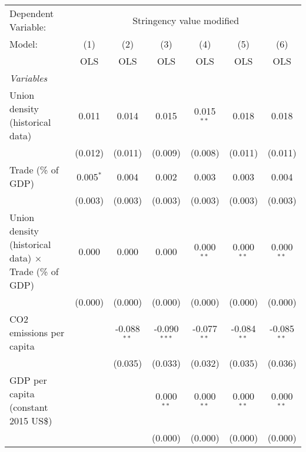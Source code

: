 
\begingroup
\centering
\begin{tabular}{lcccccc}
   \toprule
   Dependent Variable: & \multicolumn{6}{c}{Stringency value modified}\\
   Model:                                                       & (1)         & (2)           & (3)            & (4)           & (5)           & (6)\\  
                                                                &  OLS        & OLS           & OLS            & OLS           & OLS           & OLS\\  
   \midrule
   \emph{Variables}\\
   Union density (historical data)                              & 0.011       & 0.014         & 0.015          & 0.015$^{**}$  & 0.018         & 0.018\\   
                                                                & (0.012)     & (0.011)       & (0.009)        & (0.008)       & (0.011)       & (0.011)\\   
   Trade (\% of GDP)                                            & 0.005$^{*}$ & 0.004         & 0.002          & 0.003         & 0.003         & 0.004\\   
                                                                & (0.003)     & (0.003)       & (0.003)        & (0.003)       & (0.003)       & (0.003)\\   
   Union density (historical data) $\times$ Trade (\% of GDP)   & 0.000       & 0.000         & 0.000          & 0.000$^{**}$  & 0.000$^{**}$  & 0.000$^{**}$\\   
                                                                & (0.000)     & (0.000)       & (0.000)        & (0.000)       & (0.000)       & (0.000)\\   
   CO2 emissions per capita                                     &             & -0.088$^{**}$ & -0.090$^{***}$ & -0.077$^{**}$ & -0.084$^{**}$ & -0.085$^{**}$\\   
                                                                &             & (0.035)       & (0.033)        & (0.032)       & (0.035)       & (0.036)\\   
   GDP per capita (constant 2015 US\$)                          &             &               & 0.000$^{**}$   & 0.000$^{**}$  & 0.000$^{**}$  & 0.000$^{**}$\\   
                                                                &             &               & (0.000)        & (0.000)       & (0.000)       & (0.000)\\   

\end{tabular}
